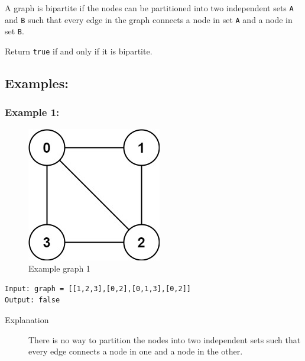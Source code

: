 \documentclass[11pt]{article}
\begin{document}
A graph is bipartite if the nodes can be partitioned into two independent sets \texttt{A} and \texttt{B} such that every edge in the graph connects a node in set \texttt{A} and a node in set \texttt{B}.

Return \texttt{true} if and only if it is bipartite.

\subsection{Examples:}
\label{sec:org4777265}

\subsubsection{Example 1:}
\label{sec:org6fe0cd2}
\begin{figure}[htbp]
\centering
\includegraphics[width=.9\linewidth]{./img/bi2.jpg}
\caption{Example graph 1}
\end{figure}

\begin{verbatim}
Input: graph = [[1,2,3],[0,2],[0,1,3],[0,2]]
Output: false
\end{verbatim}

\begin{description}
\item[{Explanation}] There is no way to partition the nodes into two independent sets such that every edge connects a node in one and a node in the other.
\end{description}
\end{document}
